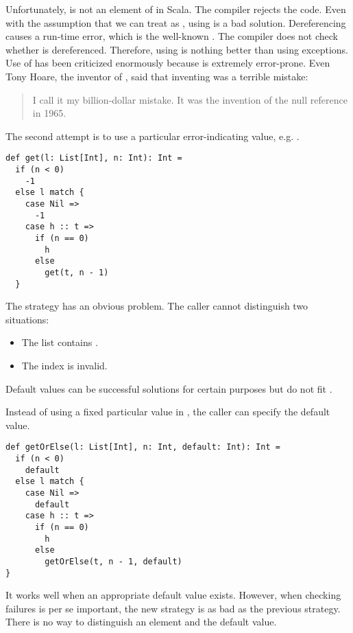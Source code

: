 Unfortunately,  is not an element of  in Scala.
The compiler rejects the code.
Even with the assumption that we can treat  as ,
using  is a bad solution. Dereferencing  causes a
run-time error, which is the well-known .
The compiler does not check whether  is dereferenced.
Therefore, using  is nothing better than using exceptions.
Use of  has been criticized enormously because  is extremely
error-prone. Even Tony Hoare, the inventor of , said that inventing
 was a terrible mistake:

\begin{quote}
I call it my billion-dollar mistake. It was the invention of the null reference
in 1965.
\end{quote}

The second attempt is to use a particular error-indicating value, e.g. .

\begin{verbatim}
def get(l: List[Int], n: Int): Int =
  if (n < 0)
    -1
  else l match {
    case Nil =>
      -1
    case h :: t =>
      if (n == 0)
        h
      else
        get(t, n - 1)
  }
\end{verbatim}

The strategy has an obvious problem. The caller cannot distinguish two
situations:
\begin{itemize}
  \item The list contains .
  \item The index is invalid.
\end{itemize}
Default values can be successful solutions for certain purposes but do not fit .

Instead of using a fixed particular value in , the caller can specify the default value.

\begin{verbatim}
def getOrElse(l: List[Int], n: Int, default: Int): Int =
  if (n < 0)
    default
  else l match {
    case Nil =>
      default
    case h :: t =>
      if (n == 0)
        h
      else
        getOrElse(t, n - 1, default)
}
\end{verbatim}

It works well when an appropriate default value
exists. However, when checking failures is per se important, the new strategy is
as bad as the previous strategy. There is no way to distinguish an element and
the default value.

